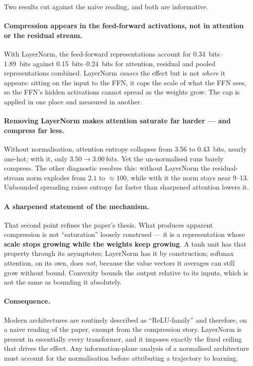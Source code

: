 \documentclass[11pt,a4paper]{article}
\begin{document}
Two results cut against the naive reading, and both are informative.

\paragraph{Compression appears in the feed-forward activations, not in attention
or the residual stream.} With LayerNorm, the feed-forward representations account
for \SIrange{0.34}{1.89}{bits} against \SIrange{0.15}{0.24}{bits} for
attention, residual and pooled representations combined. LayerNorm \emph{causes}
the effect but is not \emph{where} it appears: sitting on the input to the FFN, it
caps the scale of what the FFN sees, so the FFN's hidden activations cannot spread
as the weights grow. The cap is applied in one place and measured in another.

\paragraph{Removing LayerNorm makes attention saturate far harder --- and
compress far less.} Without normalisation, attention entropy collapses from
\SI{3.56}{} to \SI{0.43}{bits}, nearly one-hot; with it, only
$3.50 \to \SI{3.00}{bits}$. Yet the un-normalised runs barely compress. The other
diagnostic resolves this: without LayerNorm the residual-stream norm explodes from
$2.1$ to $\approx 100$, while with it the norm stays near \numrange{9}{13}.
Unbounded spreading raises entropy far faster than sharpened attention lowers it.

\paragraph{A sharpened statement of the mechanism.} That second point refines the
paper's thesis. What produces apparent compression is not ``saturation'' loosely
construed --- it is a representation whose \textbf{scale stops growing while the
weights keep growing}. A tanh unit has that property through its asymptotes;
LayerNorm has it by construction; softmax attention, on its own, does \emph{not},
because the value vectors it averages can still grow without bound. Convexity
bounds the output relative to its inputs, which is not the same as bounding it
absolutely.

\paragraph{Consequence.} Modern architectures are routinely described as
``ReLU-family'' and therefore, on a naive reading of the paper, exempt from the
compression story. LayerNorm is present in essentially every transformer, and it
imposes exactly the fixed ceiling that drives the effect. Any information-plane
analysis of a normalised architecture must account for the normalisation before
attributing a trajectory to learning.
\end{document}
